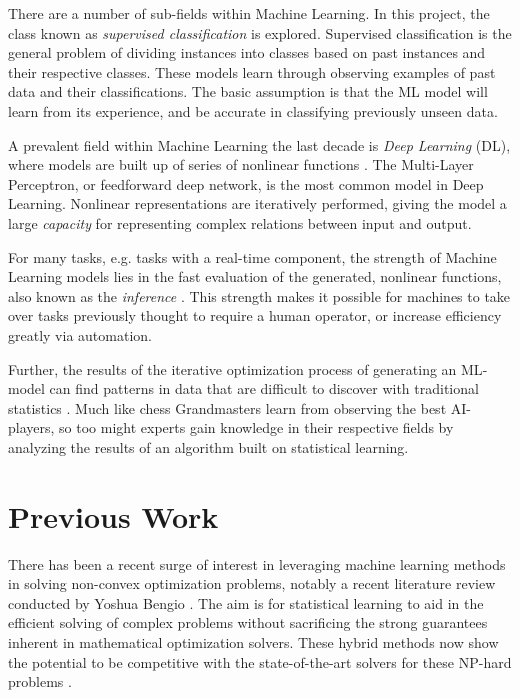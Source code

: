 There are a number of sub-fields within Machine Learning. In this project, the class known as \textit{supervised classification} is explored. Supervised classification is the general problem of dividing instances into classes based on past instances and their respective classes. These models learn through observing examples of past data and their classifications. The basic assumption is that the \gls{ML} model will learn from its experience, and be accurate in classifying previously unseen data. 

A prevalent field within Machine Learning the last decade is \textit{Deep Learning} (DL), where models are built up of series of nonlinear functions \cite{goodfellow2016deep}. 
The Multi-Layer Perceptron, or feedforward deep network, is the most common model in Deep Learning. Nonlinear representations are iteratively performed, giving the model a large \textit{capacity} for representing complex relations between input and output. 

For many tasks, e.g. tasks with a real-time component, the strength of Machine Learning models lies in the fast evaluation of the generated, nonlinear functions, also known as the \textit{inference} \cite{bertsimas2019online}. This strength makes it possible for machines to take over tasks previously thought to require a human operator, or increase efficiency greatly via automation.

Further, the results of the iterative optimization process of generating an \gls{ML}-model can find patterns in data that are difficult to discover with traditional statistics \cite{goodfellow2016deep}. Much like chess Grandmasters learn from observing the best AI-players, so too might experts gain knowledge in their respective fields by analyzing the results of an algorithm built on statistical learning.  


\section{Previous Work}

There has been a recent surge of interest in leveraging machine learning methods in solving non-convex optimization problems, notably a recent literature review conducted by Yoshua Bengio \cite{bengio2020machine}. The aim is for statistical learning to aid in the efficient solving of complex problems without sacrificing the strong guarantees inherent in mathematical optimization solvers. These hybrid methods now show the potential to be competitive with the state-of-the-art solvers for these \gls{NP}-hard problems \cite{gasse2019exact}. 

